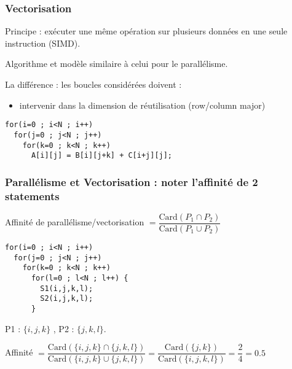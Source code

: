 \documentclass[5pt, compress]{beamer}
\begin{document}
\begin{frame}[fragile]
    \frametitle{Vectorisation}
        Principe : exécuter une même opération sur plusieurs données en une seule instruction (SIMD).
        \pause
        \bigskip

        Algorithme et modèle similaire à celui pour le parallélisme.

        \medskip

        La différence : les boucles considérées doivent :
        \vspace{-1em}
        \begin{itemize}
            \item intervenir dans la dimension de réutilisation (row/column major)
        \end{itemize}

\begin{tcolorbox}
\begin{verbatim}
for(i=0 ; i<N ; i++)
  for(j=0 ; j<N ; j++)
    for(k=0 ; k<N ; k++)
      A[i][j] = B[i][j+k] + C[i+j][j];
\end{verbatim}
\end{tcolorbox}

\end{frame}
\begin{frame}[fragile]
    \frametitle{Parallélisme et Vectorisation : noter l'affinité de 2 statements}
        \vspace{-2em}
        \begin{center}
            Affinité de parallélisme/vectorisation $=  \dfrac{\mathrm{Card}( {P_1} \cap {P_2})}{\mathrm{Card}({P_1} \cup {P_2})}$
        \end{center}
        \vspace{-1em}
\begin{tcolorbox}
\begin{verbatim}
for(i=0 ; i<N ; i++)
  for(j=0 ; j<N ; j++)
    for(k=0 ; k<N ; k++)
      for(l=0 ; l<N ; l++) {
        S1(i,j,k,l);
        S2(i,j,k,l);
      }
\end{verbatim}
\end{tcolorbox}
P1 : $\{i,j,k\}$ , P2 : $\{j,k,l\}$.

\medskip

Affinité $= \dfrac{\mathrm{Card}(\{i,j,k\} \cap \{j,k,l\})}{\mathrm{Card}(\{i,j,k\} \cup \{j,k,l\})}
          = \dfrac{\mathrm{Card}(\{j,k\})}{\mathrm{Card}(\{i,j,k,l\})}
          = \dfrac{2}{4} = 0.5$

\end{frame}
\end{document}
